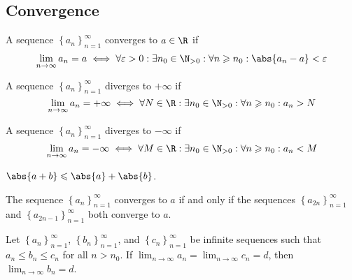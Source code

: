 \documentclass{article}
\begin{document}
\subsection{Convergence}
\begin{theorem}
    A sequence \(\left\{a_n\right\}_{n=1}^\infty\) converges to \(a\in \R\) if
    \begin{equation*}
        \lim_{n \to \infty}a_n = a \iff \forall \varepsilon > 0 : \exists n_0 \in \N_{> 0}:\forall n \geqslant n_0 : \abs{a_n - a} < \varepsilon
    \end{equation*}
\end{theorem}
%
\begin{theorem}
    A sequence \(\left\{a_n\right\}_{n=1}^\infty\) diverges to \(+\infty\) if
    \begin{equation*}
        \lim_{n \to \infty}a_n = +\infty \iff \forall N \in \R : \exists n_0 \in \N_{> 0}:\forall n \geqslant n_0 : a_n > N
    \end{equation*}
\end{theorem}
%
\begin{theorem}
    A sequence \(\left\{a_n\right\}_{n=1}^\infty\) diverges to \(-\infty\) if
    \begin{equation*}
        \lim_{n \to \infty}a_n = -\infty \iff \forall M \in \R : \exists n_0 \in \N_{> 0}:\forall n \geqslant n_0 : a_n < M
    \end{equation*}
\end{theorem}
%
\begin{theorem}
    \(\abs{a+b}\leqslant\abs{a}+\abs{b}\).
\end{theorem}
%
\begin{theorem}
    The sequence \(\left\{ a_n \right\}_{n=1}^\infty\) converges to \(a\) if and only if the sequences \(\left\{ a_{2n} \right\}_{n=1}^\infty\) and \(\left\{ a_{2n-1} \right\}_{n=1}^\infty\) both converge to \(a\).
\end{theorem}
%
\begin{theorem}
    Let \(\left\{ a_n \right\}_{n=1}^\infty\), \(\left\{ b_n \right\}_{n=1}^\infty\), and \(\left\{ c_n \right\}_{n=1}^\infty\) be infinite sequences such that \(a_n \leqslant b_n \leqslant c_n\) for all \(n>n_0\). If \(\lim_{n\to\infty}a_n=\lim_{n\to\infty}c_n=d\), then \(\lim_{n\to\infty}b_n=d\).
\end{theorem}
%
\end{document}
